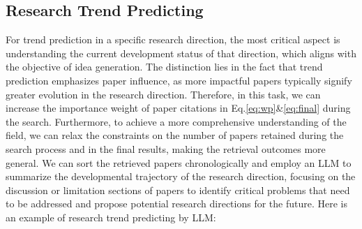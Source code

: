 \subsection{Research Trend Predicting}
For trend prediction in a specific research direction, the most critical aspect is understanding the current development status of that direction, which aligns with the objective of idea generation.
The distinction lies in the fact that trend prediction emphasizes paper influence, as more impactful papers typically signify greater evolution in the research direction.
Therefore, in this task, we can increase the importance weight of paper citations in Eq.\ref{eq:wp}\&\ref{eq:final} during the search.
Furthermore, to achieve a more comprehensive understanding of the field, we can relax the constraints on the number of papers retained during the search process and in the final results, making the retrieval outcomes more general.
We can sort the retrieved papers chronologically and employ an LLM to summarize the developmental trajectory of the research direction, focusing on the discussion or limitation sections of papers to identify critical problems that need to be addressed and propose potential research directions for the future.
Here is an example of research trend predicting by LLM:
